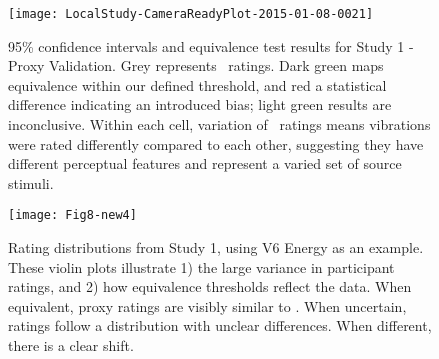 \begin{figure}[tb]
	\centering
	\texttt{[image: LocalStudy-CameraReadyPlot-2015-01-08-0021]}
	\caption{95\% confidence intervals and equivalence test results for Study 1 - Proxy Validation. Grey represents  \hifi~ratings. Dark green maps equivalence within our defined threshold, and red a statistical difference indicating an introduced bias; light green results are inconclusive. Within each cell, variation of \hifi~ratings means vibrations were rated differently compared to each other, suggesting they have different perceptual features and represent a varied set of source stimuli.
	}
	
	\label{fig:results:study1}
\end{figure}

\begin{figure}[tb]
	\centering
	\texttt{[image: Fig8-new4]}
	\caption{Rating distributions from Study 1, using V6 Energy as an example. These violin plots illustrate 1) the large variance in participant ratings, and 2) how equivalence thresholds reflect the data. When equivalent, proxy ratings are visibly similar to \hifi. When uncertain, ratings follow a distribution with unclear differences. When different, there is a clear shift.}
	\label{fig:violinplot}
\end{figure}

